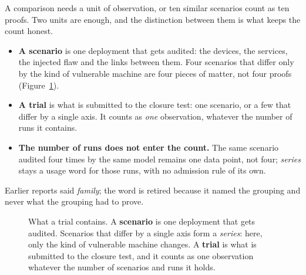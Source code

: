 A comparison needs a unit of observation, or ten similar scenarios count as ten
proofs. Two units are enough, and the distinction between them is what keeps the
count honest.

\begin{itemize}[leftmargin=1.2em,itemsep=.35em,topsep=.4em]
\item \textbf{A scenario} is one deployment that gets audited: the devices, the
services, the injected flaw and the links between them. Four scenarios that differ
only by the kind of vulnerable machine are four pieces of matter, not four proofs
(Figure~\ref{fig:units}).
\item \textbf{A trial} is what is submitted to the closure test: one scenario, or a
few that differ by a single axis. It counts as \emph{one} observation, whatever the
number of runs it contains.
\item \textbf{The number of runs does not enter the count.} The same scenario
audited four times by the same model remains one data point, not four;
\emph{series} stays a usage word for those runs, with no admission rule of its own.
\end{itemize}

Earlier reports said \emph{family}; the word is retired because it named the
grouping and never what the grouping had to prove.

\begin{figure}[tbp]
\centering
{}
\caption{What a trial contains. A \textbf{scenario} is one deployment that gets
audited. Scenarios that differ by a single axis form a \emph{series}: here, only the
kind of vulnerable machine changes. A \textbf{trial} is what is submitted to the
closure test, and it counts as one observation whatever the number of scenarios and
runs it holds.}
\label{fig:units}
\end{figure}

